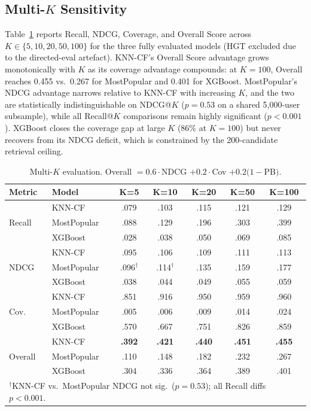 \subsection{Multi-\texorpdfstring{$K$}{K} Sensitivity}

Table~\ref{tab:multik} reports Recall, NDCG, Coverage, and Overall Score across $K\in\{5,10,20,50,100\}$ for the three fully evaluated models (HGT excluded due to the directed-eval artefact). KNN-CF's Overall Score advantage grows monotonically with $K$ as its coverage advantage compounds: at $K{=}100$, Overall reaches 0.455 vs.\ 0.267 for MostPopular and 0.401 for XGBoost. MostPopular's NDCG advantage narrows relative to KNN-CF with increasing $K$, and the two are statistically indistinguishable on NDCG@$K$ ($p{=}0.53$ on a shared 5,000-user subsample), while all Recall@$K$ comparisons remain highly significant ($p{<}0.001$). XGBoost closes the coverage gap at large $K$ (86\% at $K{=}100$) but never recovers from its NDCG deficit, which is constrained by the 200-candidate retrieval ceiling.

\begin{table}[h]
\centering\footnotesize
\caption{Multi-$K$ evaluation. Overall $= 0.6\cdot$NDCG $+ 0.2\cdot$Cov $+ 0.2(1{-}$PB$)$.}
\label{tab:multik}
\setlength{\tabcolsep}{3.2pt}
\renewcommand{\arraystretch}{1.1}
\begin{tabular}{llccccc}
\toprule
\textbf{Metric} & \textbf{Model} & \textbf{K=5} & \textbf{K=10} & \textbf{K=20} & \textbf{K=50} & \textbf{K=100}\\
\midrule
\multirow{3}{*}{Recall}
  & KNN-CF      & .079 & .103 & .115 & .121 & .129\\
  & MostPopular & .088 & .129 & .196 & .303 & .399\\
  & XGBoost     & .028 & .038 & .050 & .069 & .085\\
\midrule
\multirow{3}{*}{NDCG}
  & KNN-CF      & .095 & .106 & .109 & .111 & .113\\
  & MostPopular & .096$^\dagger$ & .114$^\dagger$ & .135 & .159 & .177\\
  & XGBoost     & .038 & .044 & .049 & .055 & .059\\
\midrule
\multirow{3}{*}{Cov.}
  & KNN-CF      & .851 & .916 & .950 & .959 & .960\\
  & MostPopular & .005 & .006 & .009 & .014 & .024\\
  & XGBoost     & .570 & .667 & .751 & .826 & .859\\
\midrule
\multirow{3}{*}{Overall}
  & KNN-CF      & \textbf{.392} & \textbf{.421} & \textbf{.440} & \textbf{.451} & \textbf{.455}\\
  & MostPopular & .110 & .148 & .182 & .232 & .267\\
  & XGBoost     & .304 & .336 & .364 & .389 & .401\\
\bottomrule
\multicolumn{7}{l}{\tiny $^\dagger$KNN-CF vs.\ MostPopular NDCG not sig.\ ($p{=}0.53$); all Recall diffs $p{<}0.001$.}
\end{tabular}
\end{table}

